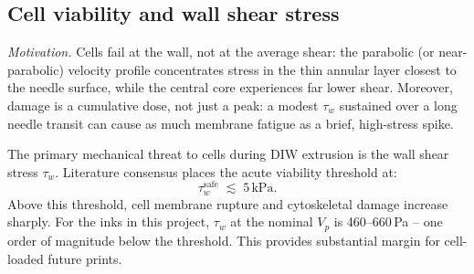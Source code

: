 \documentclass[11pt,a4paper]{article}
\begin{document}
\subsection{Cell viability and wall shear stress}

\emph{Motivation.} Cells fail at the wall, not at the average shear: the parabolic (or
near-parabolic) velocity profile concentrates stress in the thin annular
layer closest to the needle surface, while the central core experiences
far lower shear.  Moreover, damage is a cumulative dose, not just a
peak: a modest $\tau_w$ sustained over a long needle transit can cause as
much membrane fatigue as a brief, high-stress spike.

The primary mechanical threat to cells during DIW extrusion is the wall
shear stress $\tau_w$. Literature consensus \citep{BlaeserEtAl2016}
places the acute viability threshold at:
\begin{equation}
\tau_w^\mathrm{safe} \;\lesssim\; 5\,\si{\kPa}.
\label{eq:tauw_safe}
\end{equation}
Above this threshold, cell membrane rupture and cytoskeletal damage
increase sharply. For the inks in this project, $\tau_w$ at the nominal
$V_p$ is 460--660\,\si{\Pa} -- one order of magnitude below the threshold.
This provides substantial margin for cell-loaded future prints.
\end{document}
